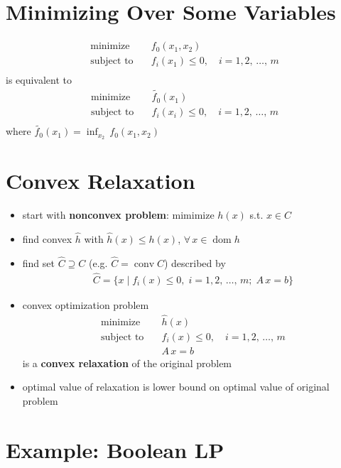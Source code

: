 \documentclass[11pt]{extarticle}
\newcommand{\ds}{\displaystyle}
\DeclareMathOperator*{\dom}{dom}
\DeclareMathOperator*{\conv}{conv}
\theoremstyle{definition}
\begin{document}
\section*{Minimizing Over Some Variables}
\begin{align*}
  \text{minimize}\quad &f_0(x_1, x_2) \\
  \text{subject to}\quad &f_i(x_1)\leqslant 0, \quad i = 1, 2,\,\ldots,\,m \\
\end{align*} 
is equivalent to 
\begin{align*}
  \text{minimize}\quad &\widetilde{f_0}(x_1) \\
  \text{subject to}\quad &f_i(x_i)\leqslant 0, \quad i = 1, 2,\,\ldots,\,m \\
\end{align*} 
where $\ds\widetilde{f_0}(x_1) = \inf_{x_2}\,f_0(x_1, x_2)$

\newpage

\section*{Convex Relaxation}
\begin{itemize}
  \item start with {\bf nonconvex problem}: mimimize $h(x)$ s.t. $x\in C$
  \item find convex $\ds\widehat{h}$ with $\ds\widehat{h}(x)\leqslant h(x)$, $\forall\,x\in\dom h$
  \item find set $\ds\widehat{C}\supseteq C$ (e.g. $\ds\widehat{C} = \conv{C}$) described by
    \begin{align*}
      \widehat{C} = \{x\;|\;f_i(x)\leqslant 0,\; i = 1, 2,\,\ldots,\,m;\;A\,x = b\}
    \end{align*}
  \item convex optimization problem
    \begin{align*}
      \text{minimize}\quad &\widehat{h}(x) \\
      \text{subject to}\quad &f_i(x)\leqslant 0, \quad i = 1, 2,\,\ldots,\,m \\
      \qquad\qquad & A\,x = b
    \end{align*}
    is a {\bf convex relaxation} of the original problem
  \item optimal value of relaxation is lower bound on optimal value of original problem
\end{itemize}

\newpage

\section*{Example: Boolean LP}
\end{document}
